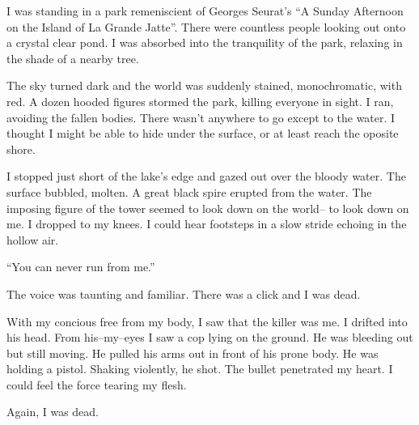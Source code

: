 \noindent
I was standing in a park remeniscient of
Georges Seurat's ``A Sunday Afternoon on the Island of La Grande Jatte''.
There were countless people looking out onto a crystal clear pond.
I was absorbed into the tranquility of the park,
relaxing in the shade of a nearby tree.


The sky turned dark and the world was suddenly stained, monochromatic, with red.
A dozen hooded figures stormed the park, killing everyone in sight.
I ran, avoiding the fallen bodies.
There wasn't anywhere to go except to the water.
I thought I might be able to hide under the surface, or at least reach
the oposite shore.


I stopped just short of the lake's edge and gazed out over the bloody water.
The surface bubbled, molten.
A great black spire erupted from the water.
The imposing figure of the tower seemed to look down on the world--
to look down on me.
I dropped to my knees.
I could hear footsteps in a slow stride echoing in the hollow air.
\VV


``You can never run from me.''
\VV


\noindent
The voice was taunting and familiar.
There was a click and I was dead.
\VV


\noindent
With my concious free from my body, I saw that the killer was me.
I drifted into his head.  From his--my--eyes I saw a cop lying on the ground.
He was bleeding out but still moving.  He pulled his arms out in front of his
prone body.  He was holding a pistol.  Shaking violently, he shot.
The bullet penetrated my heart.  I could feel the force tearing my flesh.
\VV


\noindent
Again, I was dead.

